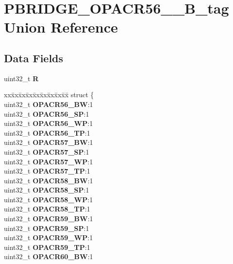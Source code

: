 \hypertarget{unionPBRIDGE__OPACR56__63__32B__tag}{}\section{P\+B\+R\+I\+D\+G\+E\+\_\+\+O\+P\+A\+C\+R56\+\_\+\_\+B\+\_\+tag Union Reference}
\label{unionPBRIDGE__OPACR56__63__32B__tag}
\subsection*{Data Fields}
\begin{DoxyCompactItemize}
\item 
\mbox{\label{unionPBRIDGE__OPACR56__63__32B__tag_a6de2b7d82e421d15299471bca553ca9c}} 
uint32\+\_\+t {\bfseries R}
\item 
\mbox{\label{unionPBRIDGE__OPACR56__63__32B__tag_a10cc6853fcc92ff4ec42b9a8463ea586}} 
\begin{tabbing}
xx\=xx\=xx\=xx\=xx\=xx\=xx\=xx\=xx\=\kill
struct \{\\
\>uint32\_t {\bfseries OPACR56\_BW}:1\\
\>uint32\_t {\bfseries OPACR56\_SP}:1\\
\>uint32\_t {\bfseries OPACR56\_WP}:1\\
\>uint32\_t {\bfseries OPACR56\_TP}:1\\
\>uint32\_t {\bfseries OPACR57\_BW}:1\\
\>uint32\_t {\bfseries OPACR57\_SP}:1\\
\>uint32\_t {\bfseries OPACR57\_WP}:1\\
\>uint32\_t {\bfseries OPACR57\_TP}:1\\
\>uint32\_t {\bfseries OPACR58\_BW}:1\\
\>uint32\_t {\bfseries OPACR58\_SP}:1\\
\>uint32\_t {\bfseries OPACR58\_WP}:1\\
\>uint32\_t {\bfseries OPACR58\_TP}:1\\
\>uint32\_t {\bfseries OPACR59\_BW}:1\\
\>uint32\_t {\bfseries OPACR59\_SP}:1\\
\>uint32\_t {\bfseries OPACR59\_WP}:1\\
\>uint32\_t {\bfseries OPACR59\_TP}:1\\
\>uint32\_t {\bfseries OPACR60\_BW}:1\\

\end{tabbing}
\end{DoxyCompactItemize}
